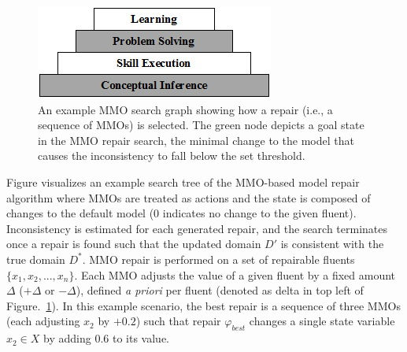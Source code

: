 \documentclass[letterpaper]{article} %
\begin{document}
\begin{figure}
\centering
\includegraphics[width=\columnwidth]{cascade.png}
\caption{An example MMO search graph showing how a repair (i.e., a sequence of MMOs) is selected. The green node depicts a goal state in the MMO repair search, the minimal change to the model that causes the inconsistency to fall below the set threshold.}
\label{fig:mmo_search}
\end{figure}

Figure visualizes an example search tree of the MMO-based model repair algorithm where MMOs are treated as actions and the state is composed of changes to the default model (0 indicates no change to the given fluent). Inconsistency is estimated for each generated repair, and the search terminates once a repair is found such that the updated domain $D'$ is consistent with the true domain $D^*$. MMO repair is performed on a set of repairable fluents $\{x_1, x_2, ..., x_n\}$. Each MMO adjusts the value of a given fluent by a fixed amount $\Delta$ ($+\Delta$ or $-\Delta$), defined \emph{a priori} per fluent (denoted as delta in top left of Figure.~\ref{fig:mmo_search}). In this example scenario, the best repair is a sequence of three MMOs (each adjusting $x_2$ by $+0.2$) such that repair $\varphi_{best}$ changes a single state variable $x_2 \in X$ by adding $0.6$ to its value.
\end{document}
